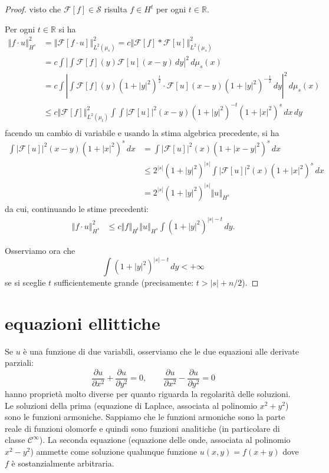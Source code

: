 \documentclass[italian,a4paper,oneside,headinclude]{scrbook}
\newcommand{\C}{\mathcal C}
\newcommand{\F}{\mathcal F}
\renewcommand{\S}{\mathcal S}
\newcommand{\RR}{\mathbb R}
\newcommand{\abs}[1]{{\left|#1\right|}}
\newcommand{\Abs}[1]{{\left\Vert #1\right\Vert}}
\begin{document}
  \begin{proof}
    visto che $\F[f]\in \S$ risulta $f\in H^t$
    per ogni $t\in\RR$.

    Per ogni $t\in \RR$ si ha
    \begin{align*}
      \Abs{f\cdot u}_{H^s}^2
      &= \Abs{\F[f\cdot u]}_{L^2(\mu_s)}^2
      = c \Abs{\F[f]*\F[u]}_{L^2(\mu_s)}^2 \\
      &= c \int \abs{\int \F[f](y) \F[u](x-y)\, dy}^2\, d\mu_s(x) \\
      &= c \int \abs{\int \F[f](y)(1+\abs{y}^2)^{\frac t 2}
      \cdot \F[u](x-y)(1+\abs{y}^2)^{-\frac t 2}\, dy}^2\, d\mu_s(x)\\
    &\le c \Abs{\F[f]}_{L^2(\mu_t)}^2
    \int \int \abs{\F[u]}^2(x-y) (1+\abs{y}^2)^{-t} (1+\abs{x}^2)^s \,
    dx\, dy\\
    \end{align*}
    facendo un cambio di variabile e
    usando la stima algebrica precedente, si ha
    \begin{align*}
      \int \abs{\F[u]}^2(x-y) (1+\abs{x}^2)^s \, dx
      &= \int \abs{\F[u]}^2(x) (1+\abs{x-y}^2)^s\, dx\\
      &\le 2^\abs{s} (1+\abs{y}^2)^{\abs{s}}
      \int \abs{\F[u]}^2(x) (1+\abs{x}^2)^{s}\, dx\\
      &= 2^{\abs{s}} (1+\abs{y}^2)^{\abs{s}} \Abs{u}_{H^s}
    \end{align*}
    da cui, continuando le stime precedenti:
    \begin{align*}
      \Abs{f\cdot u}_{H^s}^2
      & \le c \Abs{f}_{H^t} \Abs{u}_{H^s} \int
      (1+\abs{y}^2)^{\abs{s}-t}\, dy.
    \end{align*}

    Osserviamo ora che
    \[
    \int (1+\abs{y}^2)^{\abs{s}-t}\, dy < +\infty
    \]
    se si sceglie $t$ sufficientemente grande
    (precisamente: $t>\abs{s}+n/2$).
  \end{proof}

\section{equazioni ellittiche}

  Se $u$ è una funzione di due variabili, osserviamo che
  le due equazioni alle derivate parziali:
  \[
    \frac{\partial u}{\partial x^2} + \frac{\partial u}{\partial y^2}
    = 0
    , \qquad
    \frac{\partial u}{\partial x^2} - \frac{\partial u}{\partial y^2}
    = 0
  \]
  hanno proprietà molto diverse per quanto riguarda la regolarità
  delle soluzioni.
  Le soluzioni della prima (equazione di Laplace, associata al
  polinomio $x^2+y^2$) sono le funzioni
  armoniche. Sappiamo che le funzioni armoniche sono la parte reale di
  funzioni olomorfe e quindi sono funzioni analitiche (in particolare
  di classe $\C^\infty$).
  La seconda equazione (equazione delle onde, associata al polinomio
  $x^2-y^2$)
  ammette come soluzione
  qualunque funzione $u(x,y) = f(x+y)$ dove $f$ è sostanzialmente
  arbitraria.
\end{document}
